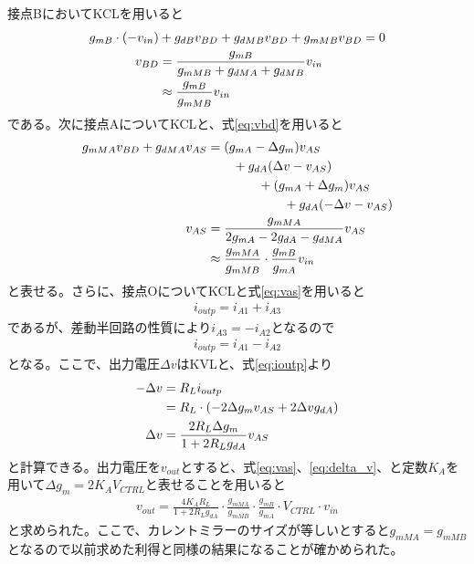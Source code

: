 \documentclass[twocolumn]{jsarticle}
\begin{document}
    接点BにおいてKCLを用いると
    \begin{align}
        g_{mB}\cdot(-v_{in})&+g_{dB}v_{BD} +g_{dMB}v_{BD}+g_{mMB}v_{BD}=0       \notag\\
        v_{BD}&=\frac{g_{mB}}{g_{mMB}+g_{dMA}+g_{dMB}}v_{in}          \notag\\
        &\approx \frac{g_{mB}}{g_{mMB}}v_{in}    \label{eq:vbd}
    \end{align}
    である。次に接点AについてKCLと、式\eqref{eq:vbd}を用いると
    \begin{align}
        g_{mMA}v_{BD}+g_{dMA}v_{AS}&=(g_{mA}-\Delta g_{m})v_{AS} \notag\\ &\quad\quad +g_{dA}(\Delta v -v_{AS})       \notag\\
        & \quad\quad\quad\quad +(g_{mA}+\Delta g_{m})v_{AS} \notag\\& \quad\quad\quad\quad\quad\quad +g_{dA}(-\Delta v -v_{AS})       \notag\\
        v_{AS}&=\frac{g_{mMA}}{2g_{mA}-2g_{dA}-g_{dMA}}v_{AS}   \notag\\
        &\approx \frac{g_{mMA}}{g_{mMB}}\cdot\frac{g_{mB}}{g_{mA}}v_{in}    \label{eq:vas}
    \end{align}
    と表せる。さらに、接点OについてKCLと式\eqref{eq:vas}を用いると
    \begin{align}
        i_{outp} = i_{A1}+i_{A3}
    \end{align}
    であるが、差動半回路の性質により$i_{A3}=-i_{A2}$となるので
    \begin{align}
        i_{outp} = i_{A1}-i_{A2}    \label{eq:ioutp}
    \end{align}
    となる。ここで、出力電圧$\Delta v$はKVLと、式\eqref{eq:ioutp}より
    \begin{align}
        -\Delta v&=R_{L}i_{outp}    \notag\\
        &=R_{L}\cdot(-2\Delta g_{m}v_{AS}+2\Delta vg_{dA})      \notag\\
        \Delta v&=\frac{2R_{L}\Delta g_{m}}{1+2R_{L}g_{dA}}v_{AS}   \label{eq:delta_v}
    \end{align}
    と計算できる。出力電圧を$v_{out}$とすると、式\eqref{eq:vas}、\eqref{eq:delta_v}、と定数$K_{A}$を用いて$\Delta g_{m}=2K_{A}V_{CTRL}$と表せることを用いると
    \begin{align}
        v_{out}=\frac{4K_{A}R_{L}}{1+2R_{L}g_{dA}}\cdot\frac{g_{mMA}}{g_{mMB}}\cdot\frac{g_{mB}}{g_{mA}}\cdot V_{CTRL}\cdot v_{in}     \label{eq:vout}
    \end{align}
    と求められた。ここで、カレントミラーのサイズが等しいとすると$g_{mMA}=g_{mMB}$となるので以前求めた利得と同様の結果になることが確かめられた。
\end{document}
